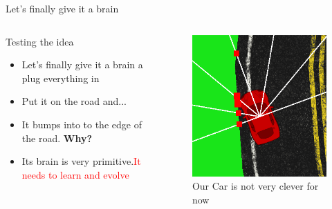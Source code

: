 \documentclass{do}
\begin{document}
\begin{frame}{Let's finally give it a brain}
    \begin{columns}
        \column{.6\textheight}
        \begin{block}{Testing the idea}
            \begin{itemize}
                \item Let's finally give it a brain a plug everything in
                \item Put it on the road and...
                \item It bumps into to the edge of the road. \textbf{Why?}
                \item Its brain is very primitive.\textcolor{red}{It needs to learn and evolve} 
            \end{itemize} 
        \end{block}
      
        \column{.4\textheight}
         \begin{figure}
            \includegraphics[width=1.0\linewidth]{cardump.png}
            \caption{\tiny Our Car is not very clever for now}
        \end{figure}
    \end{columns}
\end{frame}
\end{document}
